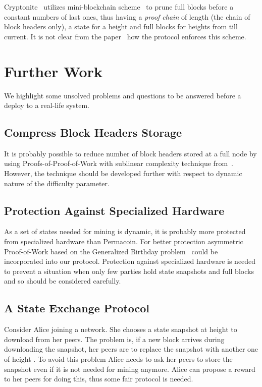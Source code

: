 \documentclass[conference,compsoc]{IEEEtran}
\begin{document}
Cryptonite~\cite{cryptonite} utilizes mini-blockchain scheme~\cite{minibc} to prune full blocks before a constant numbers of last ones, thus having a \textit{proof chain} of length  (the chain of block headers only), a state for a height  and full blocks for heights from  till current. It is not clear from the paper~\cite{minibc} how the protocol enforces this scheme.



\section{Further Work}

We highlight some unsolved problems and questions to be answered before a deploy to a real-life system.

\subsection{Compress Block Headers Storage}

It is probably possible to reduce number of block headers stored at a full node by using Proofs-of-Proof-of-Work with sublinear complexity technique from~\cite{kiayiasproofs}. However, the technique should be developed further with respect to dynamic nature of the difficulty parameter.


\subsection{Protection Against Specialized Hardware}

As a set of states needed for mining is dynamic, it is probably more protected from specialized hardware than Permacoin. For better protection asymmetric Proof-of-Work based on the Generalized Birthday problem~\cite{biryukov2016asymmetric} could be incorporated into our protocol. Protection against specialized hardware is needed to prevent a situation when only few parties hold state snapshots and full blocks and so should be considered carefully.


\subsection{A State Exchange Protocol}

Consider Alice joining a network. She chooses a state snapshot at height  to download from her peers. The problem is, if a new block arrives during downloading the snapshot, her peers are to replace the snapshot with another one of height . To avoid this problem Alice needs to ask her peers to store the snapshot even if it is not needed for mining anymore. Alice can propose a reward to her peers for doing this, thus some fair protocol is needed.
\end{document}
